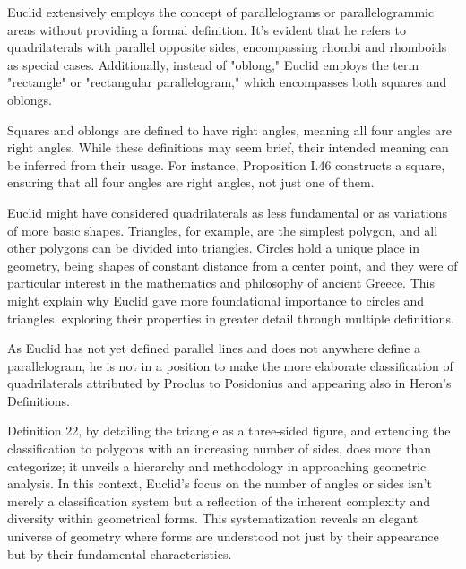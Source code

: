 Euclid extensively employs the concept of parallelograms or parallelogrammic areas without providing a formal definition. It's evident that he refers to quadrilaterals with parallel opposite sides, encompassing rhombi and rhomboids as special cases. Additionally, instead of "oblong," Euclid employs the term "rectangle" or "rectangular parallelogram," which encompasses both squares and oblongs.

Squares and oblongs are defined to have right angles, meaning all four angles are right angles. While these definitions may seem brief, their intended meaning can be inferred from their usage. For instance, Proposition I.46 constructs a square, ensuring that all four angles are right angles, not just one of them.

Euclid might have considered quadrilaterals as less fundamental or as variations of more basic shapes. Triangles, for example, are the simplest polygon, and all other polygons can be divided into triangles. Circles hold a unique place in geometry, being shapes of constant distance from a center point, and they were of particular interest in the mathematics and philosophy of ancient Greece. This might explain why Euclid gave more foundational importance to circles and triangles, exploring their properties in greater detail through multiple definitions.

As Euclid has not yet defined parallel lines and does not anywhere define a parallelogram, he is not in a position to make the more elaborate classification of quadrilaterals attributed by Proclus to Posidonius and appearing also in Heron's Definitions.

Definition 22, by detailing the triangle as a three-sided figure, and extending the classification to polygons with an increasing number of sides, does more than categorize; it unveils a hierarchy and methodology in approaching geometric analysis. In this context, Euclid's focus on the number of angles or sides isn't merely a classification system but a reflection of the inherent complexity and diversity within geometrical forms. This systematization reveals an elegant universe of geometry where forms are understood not just by their appearance but by their fundamental characteristics.

\clearpage